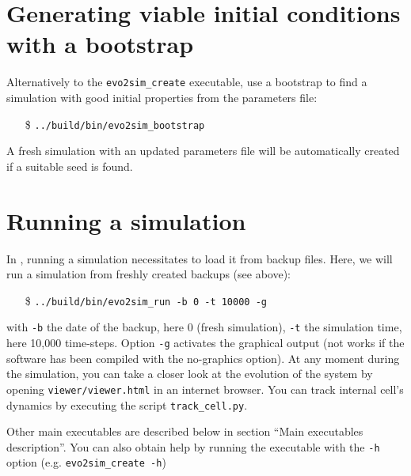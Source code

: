 \section{Generating viable initial conditions with a bootstrap}

Alternatively to the \texttt{evo2sim\_create} executable, use a bootstrap to find a simulation with good initial properties from the parameters file:
\begin{itemize}
        \item[\$] \texttt{../build/bin/evo2sim\_bootstrap}
\end{itemize}
A fresh simulation with an updated parameters file will be automatically created if a suitable seed is found.

\section{Running a simulation}

In {\packageName}, running a simulation necessitates to load it from backup files. Here, we will run a simulation from freshly created backups (see above):
\begin{itemize}
        \item[\$] \texttt{../build/bin/evo2sim\_run -b 0 -t 10000 -g}
\end{itemize}
with \texttt{-b} the date of the backup, here 0 (fresh simulation), \texttt{-t} the simulation time, here 10,000 time-steps. Option \texttt{-g} activates the graphical output (not works if the software has been compiled with the no-graphics option).
At any moment during the simulation, you can take a closer look at the evolution of the system by opening \texttt{viewer/viewer.html} in an internet browser. You can track internal cell's dynamics by executing the script \texttt{track\_cell.py}.

Other main executables are described below in section ``Main executables description''. You can also obtain help by running the executable with the \texttt{-h} option (e.g. \texttt{evo2sim\_create -h})
